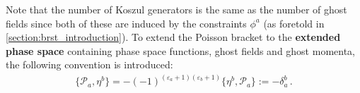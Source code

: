 
    Note that the number of Koszul generators is the same as the number of ghost fields since both of these are induced by the constraints $\phi^a$ (as foretold in \cref{section:brst_introduction}). To extend the Poisson bracket to the \textbf{extended phase space} containing phase space functions, ghost fields and ghost momenta, the following convention is introduced:
    \begin{gather}
        \{\mathcal{P}_a,\eta^b\} = -(-1)^{(\varepsilon_a+1)(\varepsilon_b+1)}\{\eta^b,\mathcal{P}_a\} := -\delta_a^b\,.
    \end{gather}

